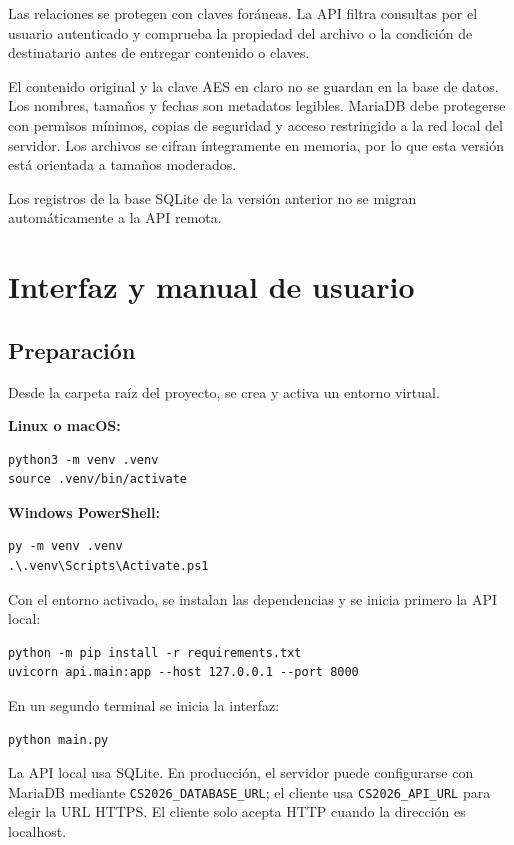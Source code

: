\documentclass[12pt,a4paper]{article}
\begin{document}
Las relaciones se protegen con claves foráneas. La API filtra consultas por el usuario autenticado y comprueba la propiedad del archivo o la condición de destinatario antes de entregar contenido o claves.

El contenido original y la clave AES en claro no se guardan en la base de datos. Los nombres, tamaños y fechas son metadatos legibles. MariaDB debe protegerse con permisos mínimos, copias de seguridad y acceso restringido a la red local del servidor. Los archivos se cifran íntegramente en memoria, por lo que esta versión está orientada a tamaños moderados.

Los registros de la base SQLite de la versión anterior no se migran automáticamente a la API remota.

\section{Interfaz y manual de usuario}

\subsection{Preparación}

Desde la carpeta raíz del proyecto, se crea y activa un entorno virtual.

\textbf{Linux o macOS:}
\begin{verbatim}
python3 -m venv .venv
source .venv/bin/activate
\end{verbatim}

\textbf{Windows PowerShell:}
\begin{verbatim}
py -m venv .venv
.\.venv\Scripts\Activate.ps1
\end{verbatim}

Con el entorno activado, se instalan las dependencias y se inicia primero la API local:

\begin{verbatim}
python -m pip install -r requirements.txt
uvicorn api.main:app --host 127.0.0.1 --port 8000
\end{verbatim}

En un segundo terminal se inicia la interfaz:
\begin{verbatim}
python main.py
\end{verbatim}

La API local usa SQLite. En producción, el servidor puede configurarse con MariaDB mediante \texttt{CS2026\_DATABASE\_URL}; el cliente usa \texttt{CS2026\_API\_URL} para elegir la URL HTTPS. El cliente solo acepta HTTP cuando la dirección es localhost.
\end{document}
